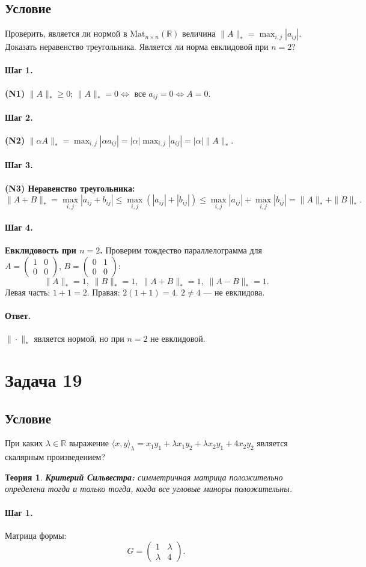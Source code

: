 \documentclass[12pt,a4paper]{article}
\theoremstyle{solution}
\newtheorem*{theory}{Теория}
\newcommand{\task}[1]{\newpage\section*{Задача #1}}
\newcommand{\answer}{\paragraph{Ответ.}}
\newcommand{\step}[1]{\paragraph{Шаг #1.}}
\newcommand{\R}{\mathbb{R}}
\begin{document}
\subsection*{Условие}
Проверить, является ли нормой в $\mathrm{Mat}_{n\times n}(\R)$ величина $\|A\|_*=\max_{i,j}|a_{ij}|$. Доказать неравенство треугольника. Является ли норма евклидовой при $n=2$?

\step{1} \textbf{(N1)} $\|A\|_*\geq0$; $\|A\|_*=0\Leftrightarrow$ все $a_{ij}=0\Leftrightarrow A=0$.

\step{2} \textbf{(N2)} $\|\alpha A\|_*=\max_{i,j}|\alpha a_{ij}|=|\alpha|\max_{i,j}|a_{ij}|=|\alpha|\|A\|_*$.

\step{3} \textbf{(N3) Неравенство треугольника:}
\[
\|A+B\|_*=\max_{i,j}|a_{ij}+b_{ij}|\leq\max_{i,j}(|a_{ij}|+|b_{ij}|)\leq\max_{i,j}|a_{ij}|+\max_{i,j}|b_{ij}|=\|A\|_*+\|B\|_*.
\]

\step{4} \textbf{Евклидовость при $n=2$.} Проверим тождество параллелограмма для $A=\begin{pmatrix}1&0\\0&0\end{pmatrix}$, $B=\begin{pmatrix}0&1\\0&0\end{pmatrix}$:
\[
\|A\|_*=1,\;\|B\|_*=1,\;\|A+B\|_*=1,\;\|A-B\|_*=1.
\]
Левая часть: $1+1=2$. Правая: $2(1+1)=4$. $2\neq4$ --- не евклидова.

\answer $\|\cdot\|_*$ является нормой, но при $n=2$ не евклидовой.

\task{19}
\subsection*{Условие}
При каких $\lambda\in\R$ выражение $\langle x,y\rangle_\lambda=x_1y_1+\lambda x_1y_2+\lambda x_2y_1+4x_2y_2$ является скалярным произведением?

\begin{theory}
\textbf{Критерий Сильвестра:} симметричная матрица положительно определена тогда и только тогда, когда все угловые миноры положительны.
\end{theory}

\step{1} Матрица формы:
\[
G=\begin{pmatrix}1&\lambda\\\lambda&4\end{pmatrix}.
\]
\end{document}
